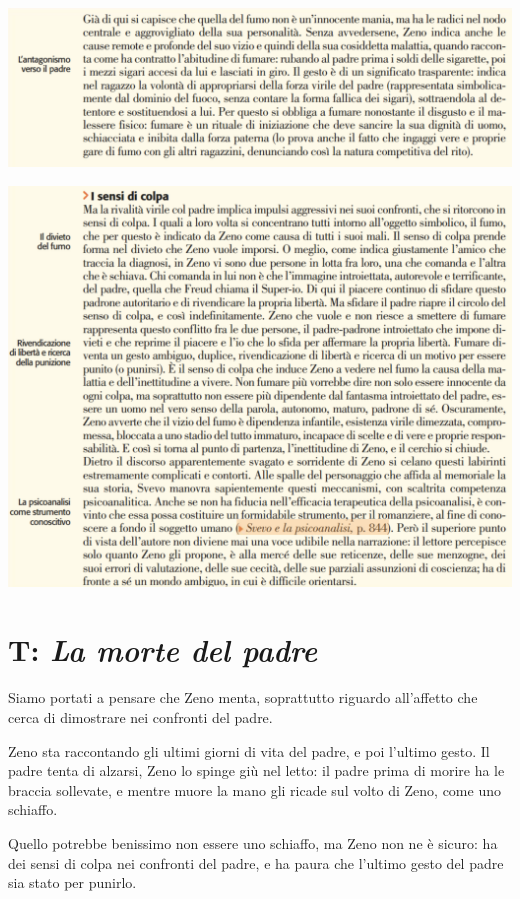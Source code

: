 \documentclass[a4paper, twoside, titlepage]{book}
\begin{document}
\begin{center}
\includegraphics[width=\textwidth]{fumo2}
\end{center}
\vfill
\begin{center}
\includegraphics[width=\textwidth]{fumo3}
\end{center}

\section{T: \textit{La morte del padre}}

Siamo portati a pensare che Zeno menta, soprattutto riguardo all'affetto che cerca di dimostrare nei confronti del padre.

Zeno sta raccontando gli ultimi giorni di vita del padre, e poi l'ultimo gesto. Il padre tenta di alzarsi, Zeno lo spinge giù nel letto: il padre prima di morire ha le braccia sollevate, e mentre muore la mano gli ricade sul volto di Zeno, come uno schiaffo.

Quello potrebbe benissimo non essere uno schiaffo, ma Zeno non ne è sicuro: ha dei sensi di colpa nei confronti del padre, e ha paura che l'ultimo gesto del padre sia stato per punirlo.
\end{document}
